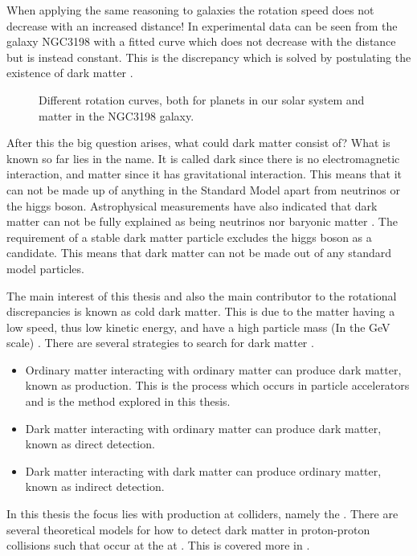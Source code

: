 When applying the same reasoning to galaxies the rotation speed does not decrease with an increased distance! In  experimental data can be seen from the galaxy NGC3198 with a fitted curve which does not decrease with the distance but is instead constant.  This is the discrepancy which is solved by postulating the existence of dark matter \citep{1933AcHPh}.
 \begin{figure}[h] %
    \hfill
    \caption{Different rotation curves, both for planets in our solar system and matter in the NGC3198 galaxy.}
    \label{fig:rotation}
  \end{figure}
After this the big question arises, what could dark matter consist of? What is known so far lies in the name. It is called dark since there is no electromagnetic interaction, and matter since it has gravitational interaction. This means that it can not be made up of anything in the Standard Model apart from neutrinos or the higgs boson. Astrophysical measurements have also indicated that dark matter can not be fully explained as being neutrinos nor baryonic matter \citep{Gondolo:2003}. The requirement of a stable dark matter particle excludes the higgs boson as a candidate. This means that dark matter can not be made out of any standard model particles. 

The main interest of this thesis and also the main contributor to the rotational discrepancies is known as cold dark matter. This is due to the matter having a low speed, thus low kinetic energy, and have a high particle mass (In the GeV scale) \citep{Goodman:2010,CERN-PH-EP-2012-210,Jungman:1996}.
There are several strategies to search for dark matter \citep{Jungman:1996}.
\begin{itemize}
\item Ordinary matter interacting with ordinary matter can produce dark matter, known as production. This is the process which occurs in particle accelerators and is the method explored in this thesis.
\item Dark matter interacting with ordinary matter can produce dark matter, known as direct detection.
\item Dark matter interacting with dark matter can produce ordinary matter, known as indirect detection.
\end{itemize} 
In this thesis the focus lies with production at colliders, namely the \abbrLHC . There are several theoretical models for how to detect dark matter in proton-proton collisions such that occur at the \abbrLHC at \abbrCERN. This is covered more in . 

